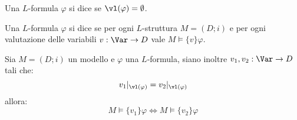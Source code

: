 \begin{definition}
    Una $L$-formula $\varphi$ si dice  se $\vl(\varphi) = \emptyset$.
\end{definition}

\begin{definition}
    Una $L$-formula $\varphi$ si dice  se per ogni $L$-struttura $M = (D;i)$ e per ogni valutazione delle variabili $v : \Var \to D$ vale $M \models \{v\}\varphi$.
\end{definition}

\begin{remark}
    Sia $M = (D;i)$ un modello e $\varphi$ una $L$-formula, siano inoltre $v_1,v_2 : \Var \to D$ tali che:
    \[ v_1|_{\vl(\varphi)} = v_2|_{\vl(\varphi)}
    \]
    allora:
    \[ M \models \{v_1\} \varphi \iff M \models \{v_2\} \varphi
    \] 
\end{remark}

